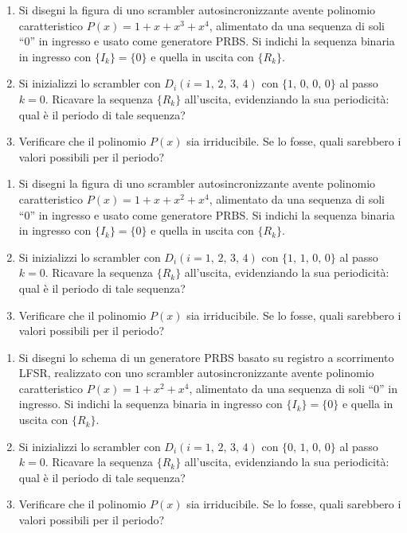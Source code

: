         \begin{enumerate}
            \item Si disegni la figura di uno scrambler autosincronizzante avente polinomio caratteristico 
                $P(x)= 1 +x +x^3 +x^4$, alimentato da una sequenza di soli ``0'' in ingresso e usato come generatore PRBS. 
                Si indichi la sequenza binaria in ingresso con $\{I_k\}=\{0\}$ e quella in uscita con $\{R_k\}$.
            \item Si inizializzi lo scrambler con $D_i(i=1,\,2,\,3,\,4)$ con $\{1,\,0,\,0,\,0\}$ al passo $k=0$. 
                Ricavare la sequenza $\{R_k\}$ all'uscita, evidenziando la sua periodicità: qual è il periodo di 
                tale sequenza?
            \item Verificare che il polinomio $P(x)$ sia irriducibile. Se lo fosse, quali sarebbero i valori 
                possibili per il periodo?
        \end{enumerate}

        \begin{enumerate}
            \item Si disegni la figura di uno scrambler autosincronizzante avente polinomio caratteristico 
                $P(x)= 1 +x +x^2 +x^4$, alimentato da una sequenza di soli ``0'' in ingresso e usato come generatore PRBS. 
                Si indichi la sequenza binaria in ingresso con $\{I_k\}=\{0\}$ e quella in uscita con $\{R_k\}$.
            \item Si inizializzi lo scrambler con $D_i(i=1,\,2,\,3,\,4)$ con $\{1,\,1,\,0,\,0\}$ al passo $k=0$. 
                Ricavare la sequenza $\{R_k\}$ all'uscita, evidenziando la sua periodicità: qual è il periodo di 
                tale sequenza?
            \item Verificare che il polinomio $P(x)$ sia irriducibile. Se lo fosse, quali sarebbero i valori 
                possibili per il periodo?
        \end{enumerate}

        \begin{enumerate}
            \item Si disegni lo schema di un generatore PRBS basato su registro a scorrimento LFSR, realizzato con uno 
                scrambler autosincronizzante avente polinomio caratteristico $P(x)= 1 +x^2 +x^4$, alimentato da una 
                sequenza di soli ``0'' in ingresso. Si indichi la sequenza binaria in ingresso con $\{I_k\}=\{0\}$ e 
                quella in uscita con $\{R_k\}$.
            \item Si inizializzi lo scrambler con $D_i(i=1,\,2,\,3,\,4)$ con $\{0,\,1,\,0,\,0\}$ al passo $k=0$. 
                Ricavare la sequenza $\{R_k\}$ all'uscita, evidenziando la sua periodicità: qual è il periodo di 
                tale sequenza?
            \item Verificare che il polinomio $P(x)$ sia irriducibile. Se lo fosse, quali sarebbero i valori 
                possibili per il periodo?
        \end{enumerate}

